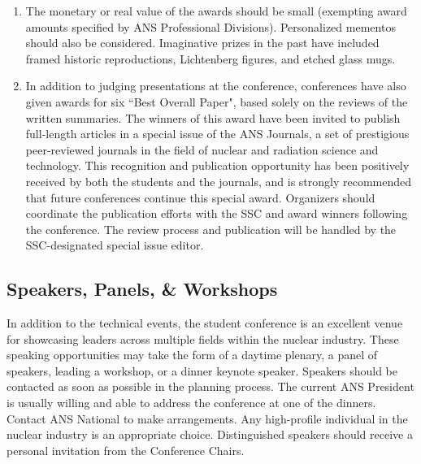 \documentclass[12pt]{article}
\begin{document}
\begin{enumerate}
    \item The monetary or real value of the awards should be small (exempting award amounts specified by ANS Professional Divisions). Personalized mementos should also be considered. Imaginative prizes in the past have included framed historic reproductions, Lichtenberg figures, and etched glass mugs. 
    \item In addition to judging presentations at the conference, conferences have also given awards for six ``Best Overall Paper", based solely on the reviews of the written summaries. The winners of this award have been invited to publish full-length articles in a special issue of the ANS Journals, a set of prestigious peer-reviewed journals in the field of nuclear and radiation science and technology. This recognition and publication opportunity has been positively received by both the students and the journals, and is strongly recommended that future conferences continue this special award. Organizers should coordinate the publication efforts with the SSC and award winners following the conference. The review process and publication will be handled by the SSC-designated special issue editor.
\end{enumerate}

\subsection{Speakers, Panels, \& Workshops}
In addition to the technical events, the student conference is an excellent venue for showcasing leaders across multiple fields within the nuclear industry.
These speaking opportunities may take the form of a daytime plenary, a panel of speakers, leading a workshop, or a dinner keynote speaker.
Speakers should be contacted as soon as possible in the planning process.
The current ANS President is usually willing and able to address the conference at one of the dinners.
Contact ANS National to make arrangements.
Any high-profile individual in the nuclear industry is an appropriate choice.
Distinguished speakers should receive a personal invitation from the Conference Chairs.
\end{document}
